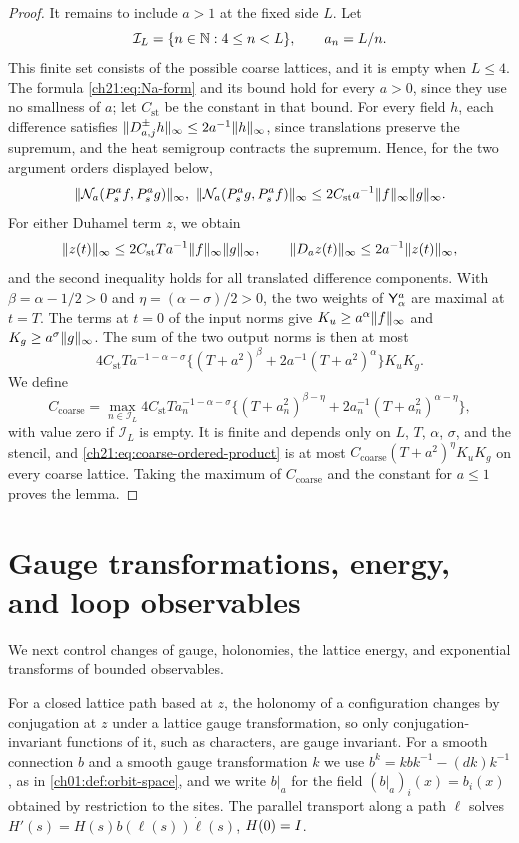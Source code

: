 \begin{proof}
It remains to include $a>1$ at the fixed side $L$. Let
\[
 \mathcal I_L=\{n\in\mathbb N:4\le n<L\},\qquad a_n=L/n .
\]
This finite set consists of the possible coarse lattices, and it is empty when $L\le4$. The formula \eqref{ch21:eq:Na-form} and its bound hold for every $a>0$, since they use no smallness of $a$; let $C_{\mathrm{st}}$ be the constant in that bound. For every field $h$, each difference satisfies $\lVert D^{\pm}_{a,j}h\rVert_\infty\le2a^{-1}\lVert h\rVert_\infty$, since translations preserve the supremum, and the heat semigroup contracts the supremum. Hence, for the two argument orders displayed below,
\[
 \lVert \mathcal N_a(P^a_sf,P^a_sg)\rVert_\infty,\ \lVert \mathcal N_a(P^a_sg,P^a_sf)\rVert_\infty\le2C_{\mathrm{st}}a^{-1}\lVert f\rVert_\infty\lVert g\rVert_\infty .
\]
For either Duhamel term $z$, we obtain
\[
 \lVert z(t)\rVert_\infty\le2C_{\mathrm{st}}Ta^{-1}\lVert f\rVert_\infty\lVert g\rVert_\infty,\qquad\lVert D_az(t)\rVert_\infty\le2a^{-1}\lVert z(t)\rVert_\infty,
\]
and the second inequality holds for all translated difference components. With $\beta=\alpha-1/2>0$ and $\eta=(\alpha-\sigma)/2>0$, the two weights of $\mathsf Y_{\alpha}^{a}$ are maximal at $t=T$. The terms at $t=0$ of the input norms give $K_u\ge a^\alpha\lVert f\rVert_\infty$ and $K_g\ge a^\sigma\lVert g\rVert_\infty$. The sum of the two output norms is then at most
\begin{equation}\label{ch21:eq:coarse-ordered-product}
 4C_{\mathrm{st}}Ta^{-1-\alpha-\sigma}\bigl\{(T+a^2)^\beta+2a^{-1}(T+a^2)^\alpha\bigr\}K_uK_g .
\end{equation}
We define
\[
 C_{\mathrm{coarse}}=\max_{n\in\mathcal I_L}4C_{\mathrm{st}}Ta_n^{-1-\alpha-\sigma}\bigl\{(T+a_n^2)^{\beta-\eta}+2a_n^{-1}(T+a_n^2)^{\alpha-\eta}\bigr\},
\]
with value zero if $\mathcal I_L$ is empty. It is finite and depends only on $L$, $T$, $\alpha$, $\sigma$, and the stencil, and \eqref{ch21:eq:coarse-ordered-product} is at most $C_{\mathrm{coarse}}(T+a^2)^\eta K_uK_g$ on every coarse lattice. Taking the maximum of $C_{\mathrm{coarse}}$ and the constant for $a\le1$ proves the lemma.
\end{proof}

\section{Gauge transformations, energy, and loop observables}\label{ch21:sec:gauge}

We next control changes of gauge, holonomies, the lattice energy, and exponential transforms of bounded observables.

For a closed lattice path based at $z$, the holonomy of a configuration changes by conjugation at $z$ under a lattice gauge transformation, so only conjugation-invariant functions of it, such as characters, are gauge invariant. For a smooth connection $b$ and a smooth gauge transformation $k$ we use $b^k=kbk^{-1}-(dk)k^{-1}$, as in \cref{ch01:def:orbit-space}, and we write $b|_a$ for the field $(b|_a)_i(x)=b_i(x)$ obtained by restriction to the sites. The parallel transport along a path $\ell$ solves $H'(s)=H(s)b(\ell(s))\dot\ell(s)$, $H(0)=I$.

